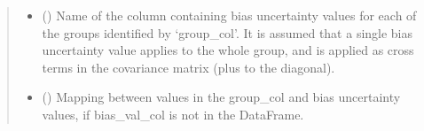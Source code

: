 \documentclass[letterpaper,10pt,english]{sphinxmanual}
\begin{document}
\begin{fulllineitems}
\begin{quote}
\begin{description}
\begin{itemize}
\item {}
\sphinxAtStartPar
{} () \textendash{} Name of the column containing bias uncertainty values for each of
the groups identified by ‘group\_col’. It is assumed that a single bias
uncertainty value applies to the whole group, and is applied as cross
terms in the covariance matrix (plus to the diagonal).

\item {}
\sphinxAtStartPar
{} () \textendash{} Mapping between values in the group\_col and bias uncertainty values,
if bias\_val\_col is not in the DataFrame.

\end{itemize}

\sphinxAtStartPar
{}

\end{description}\end{quote}

\end{fulllineitems}

\end{document}
